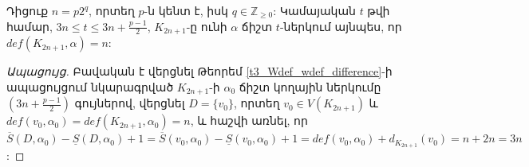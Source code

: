 \begin{corollary}
\label{c3_complete_odd_colors}
Դիցուք $n=p2^q$, որտեղ $p$-ն կենտ է, իսկ $q \in \mathbb{Z}_{\geq 0}$: Կամայական $t$ թվի համար, $3n \leq t \leq 3n + \frac{p-1}{2}$, $K_{2n+1}$-ը ունի $\alpha$ ճիշտ $t$-ներկում այնպես, որ $def(K_{2n+1},\alpha)=n$:
\end{corollary}
\begin{proof}[Ապացույց] Բավական է վերցնել Թեորեմ \ref{t3_Wdef_wdef_difference}-ի ապացույցում նկարագրված $K_{2n+1}$-ի $\alpha_0$ ճիշտ կողային ներկումը $\left(3n + \frac{p-1}{2}\right)$ գույներով, վերցնել $D=\{v_0\}$, որտեղ $v_0\in V(K_{2n+1})$ և $def(v_0,\alpha_0)=def(K_{2n+1},\alpha_0)=n$, և հաշվի առնել, որ $\overline{S}(D,\alpha_0) - \underline{S}(D,\alpha_0) + 1=\overline{S}(v_0,\alpha_0) - \underline{S}(v_0,\alpha_0) + 1= def(v_0,\alpha_0)+d_{K_{2n+1}}(v_0) =n+2n =3n$:
\end{proof}